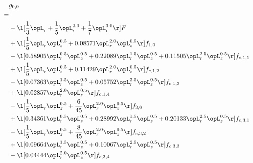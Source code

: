 \begin{alignat}{2} 
\label{eq:g_00_0} 
& g_{0,0} \nonumber \\ 
 = \\ 
& - \l[ \frac{1}{3} \opL_r + \frac{1}{5} \opL_r^{2.0} + \frac{1}{7} \opL_r^{3.0}  \r] F \nonumber \\ 
& + \l[ \frac{1}{5} \opL_r \opL_z^{0.5} +  0.08571 \opL_r^{2.0} \opL_z^{0.5}  \r] f_{1,0} \nonumber \\ 
& - \l[  0.58905 \opL_r^{0.5} \opL_z^{0.5} +  0.22089 \opL_r^{1.5} \opL_z^{0.5} +  0.11505 \opL_r^{2.5} \opL_z^{0.5}  \r] f_{c,1,1} \nonumber \\ 
& + \l[ \frac{1}{5} \opL_r \opL_z^{0.5} +  0.11429 \opL_r^{2.0} \opL_z^{0.5}  \r] f_{c,1,2} \nonumber \\ 
& - \l[  0.07363 \opL_r^{1.5} \opL_z^{0.5} +  0.05752 \opL_r^{2.5} \opL_z^{0.5}  \r] f_{c,1,3} \nonumber \\ 
& + \l[  0.02857 \opL_r^{2.0} \opL_z^{0.5}  \r] f_{c,1,4} \nonumber \\ 
& - \l[ \frac{1}{5} \opL_r \opL_z^{0.5} + \frac{6}{45} \opL_r^{2.0} \opL_z^{0.5}  \r] f_{3,0} \nonumber \\ 
& + \l[  0.34361 \opL_r^{0.5} \opL_z^{0.5} +  0.28992 \opL_r^{1.5} \opL_z^{0.5} +  0.20133 \opL_r^{2.5} \opL_z^{0.5}  \r] f_{c,3,1} \nonumber \\ 
& - \l[ \frac{1}{5} \opL_r \opL_z^{0.5} + \frac{8}{45} \opL_r^{2.0} \opL_z^{0.5}  \r] f_{c,3,2} \nonumber \\ 
& + \l[  0.09664 \opL_r^{1.5} \opL_z^{0.5} +  0.10067 \opL_r^{2.5} \opL_z^{0.5}  \r] f_{c,3,3} \nonumber \\ 
& - \l[  0.04444 \opL_r^{2.0} \opL_z^{0.5}  \r] f_{c,3,4} \nonumber \\ 
\end{alignat} 


